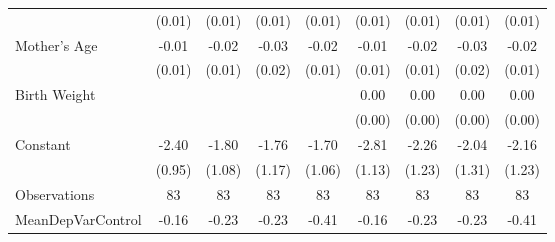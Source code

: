 {\begin{tabular}{l*{8}{c}}
                    &      (0.01)         &      (0.01)         &      (0.01)         &      (0.01)         &      (0.01)         &      (0.01)         &      (0.01)         &      (0.01)         \\
[1em]
Mother's Age        &       -0.01         &       -0.02         &       -0.03         &       -0.02         &       -0.01         &       -0.02         &       -0.03         &       -0.02         \\
                    &      (0.01)         &      (0.01)         &      (0.02)         &      (0.01)         &      (0.01)         &      (0.01)         &      (0.02)         &      (0.01)         \\
[1em]
Birth Weight        &                     &                     &                     &                     &        0.00         &        0.00         &        0.00         &        0.00         \\
                    &                     &                     &                     &                     &      (0.00)         &      (0.00)         &      (0.00)         &      (0.00)         \\
[1em]
Constant            &       -2.40\sym{**} &       -1.80\sym{*}  &       -1.76         &       -1.70         &       -2.81\sym{**} &       -2.26\sym{*}  &       -2.04         &       -2.16\sym{*}  \\
                    &      (0.95)         &      (1.08)         &      (1.17)         &      (1.06)         &      (1.13)         &      (1.23)         &      (1.31)         &      (1.23)         \\
\hline
Observations        &          83         &          83         &          83         &          83         &          83         &          83         &          83         &          83         \\
MeanDepVarControl   &       -0.16         &       -0.23         &       -0.23         &       -0.41         &       -0.16         &       -0.23         &       -0.23         &       -0.41         \\
\hline\hline
\end{tabular}
}
